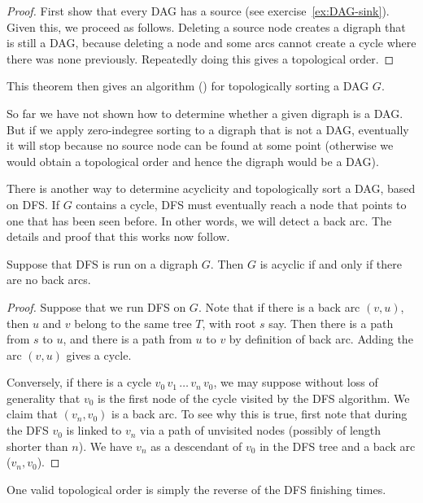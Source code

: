 \begin{proof} 
First show that every DAG has a source (see
exercise~\ref{ex:DAG-sink}).  Given this, we proceed as follows. Deleting
a source node creates a digraph that is still a DAG, because deleting
a node and some arcs cannot create a cycle where there was none
previously. Repeatedly doing this gives a topological order.
\end{proof}

This theorem then gives an algorithm ()
for topologically sorting a DAG $G$.

So far we have not shown how to determine whether a given digraph is
a DAG. But if we apply zero-indegree sorting to a digraph that is not
a DAG, eventually it will stop because no source node can be found at
some point (otherwise we would obtain a topological order and hence the
digraph would be a DAG).

There is another way to determine acyclicity and topologically sort a
DAG, based on DFS. If $G$ contains a cycle,  DFS must eventually reach
a node that points to one that has been seen before. In other words, we
will detect a back arc. The details and proof that this works now follow.

\begin{Theorem}
\label{thm:findDAG}
Suppose that DFS is run on a digraph $G$. Then $G$ is acyclic if and
only if there are no back arcs.
\end{Theorem}

\begin{proof}
Suppose that we run DFS on $G$. Note that if there is a
back arc $(v, u)$, then $u$ and $v$ belong to the same tree $T$, with
root $s$ say. Then there is a path from $s$ to $u$, and there is a path
from $u$ to $v$ by definition of back arc. Adding the arc $(v, u)$ gives
a cycle. 

Conversely, if there is a cycle $v_0\, v_1\, \dots \, v_n\, v_0$, we may
suppose without loss of generality that $v_0$ is the first node of the
cycle  visited by the DFS algorithm. We claim that $(v_n, v_0)$ is a
back arc. To see why this is true, first note that during the DFS $v_0$ is 
linked to $v_n$ via a path of unvisited nodes (possibly of length shorter 
than $n$).  We have $v_n$ as a descendant of $v_0$ in the DFS tree and
a back arc ($v_n, v_0$).
\end{proof}

One valid topological order is simply the reverse of the DFS finishing times.

